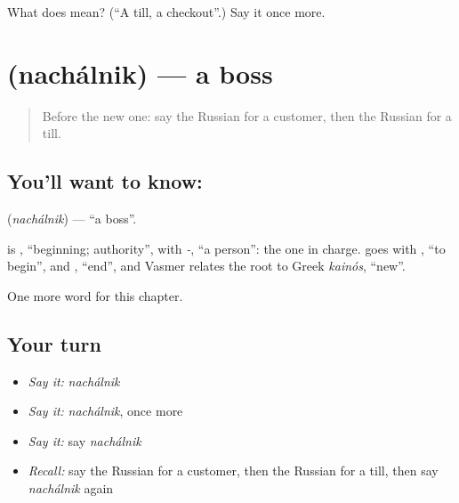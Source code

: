\begin{tcolorbox}[breakable,colback=teal!4,colframe=teal!35!black,title={Before you move on}]
What does  mean? (\textquotedblleft{}A till, a checkout\textquotedblright{}.) Say it once more.
\end{tcolorbox}
\section[\texorpdfstring{\ru{начальник} (nachálnik)}{начальник (nachálnik)}]{ (nachálnik) — a boss}

\label{lesson:RU-C110-boss}



\begin{quote}
Before the new one: say the Russian for a customer, then the Russian for a till.
\end{quote}

\subsection*{You'll want to know: }
\textbf{} (\emph{nachálnik}) — \textquotedblleft{}a boss\textquotedblright{}.

\begin{cousinweb}
\textbf{} is \emph{}, \textquotedblleft{}beginning; authority\textquotedblright{}, with \emph{-}, \textquotedblleft{}a person\textquotedblright{}: the one in charge. \emph{} goes with \emph{}, \textquotedblleft{}to begin\textquotedblright{}, and \emph{}, \textquotedblleft{}end\textquotedblright{}, and Vasmer relates the root to Greek \emph{kainós}, \textquotedblleft{}new\textquotedblright{}.
\end{cousinweb}

\begin{grammarlens}[title={What you've built}]
One more word for this chapter.
\end{grammarlens}

\subsection*{Your turn}
\begin{itemize}
\raggedright
  \item \emph{Say it:} \emph{nachálnik}
  \item \emph{Say it:} \emph{nachálnik}, once more
  \item \emph{Say it:} say \emph{nachálnik}
  \item \emph{Recall:} say the Russian for a customer, then the Russian for a till, then say \emph{nachálnik} again
\end{itemize}

